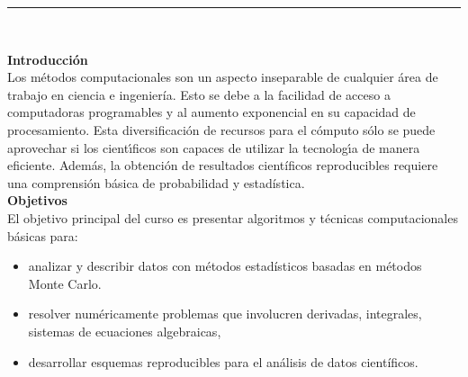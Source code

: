\documentclass[letterpaper,10pt,onecolumn]{article}
\begin{document}





\noindent\rule{\textwidth}{1pt}\\[-0.1cm]

\addtocounter{mysection}{1}

\noindent\textbf{\large {} \quad Introducci\'on}\\[-0.2cm]


\noindent\normalsize Los m\'etodos computacionales son un aspecto
inseparable de cualquier \'area de trabajo en ciencia e ingenier\'ia.
Esto se debe a la facilidad de acceso a 
computadoras programables  y al aumento exponencial en su capacidad de
procesamiento.
Esta diversificaci\'on de recursos para el c\'omputo s\'olo se puede aprovechar si 
los  cient\'{\i}ficos son capaces de utilizar la tecnolog\'{\i}a
de manera eficiente.
Adem\'as, la obtenci\'on de resultados cient\'ificos 
reproducibles requiere una comprensi\'on b\'asica de probabilidad y estad\'istica.
\\[0.1cm] 

\noindent\textbf{\large {} \quad Objetivos}\\[-0.2cm]

\noindent\normalsize El objetivo principal del curso es presentar
algoritmos y t\'ecnicas computacionales b\'asicas para:

\begin{itemize}
\item analizar y describir datos con m\'etodos estad\'isticos basadas
  en m\'etodos Monte Carlo. \\[-0.6cm]
\item resolver num\'ericamente problemas que involucren derivadas, integrales, sistemas de ecuaciones algebraicas, \\[-0.6cm]
\item desarrollar esquemas reproducibles para el an\'alisis de datos cient\'ificos. \\[-0.6cm]
\end{itemize} 
\vspace*{0.5cm} 
\end{document}
